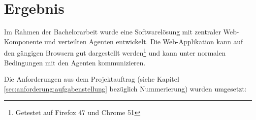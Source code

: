 \begin{comment}
Ergebnisse der Arbeit: was wurde erreicht, was wurde nicht erreicht, Ursachen.
Dieser Abschnitt richtet sich an den speziell für das entsprechende Fachgebiet
interessierten Ingenieur. Er soll es ihm ermöglichen, die für die Problemlösung
gemachten Überlegungen zu verstehen und nachzuvollziehen. Theoretische
Grundlagen sind nur so weit auszuarbeiten, als dies für die Lösung der Aufgabe
nötig ist (keine Lehrbücher schreiben). Die Erkenntnisse aus den theoretischen
Untersuchungen sind wenn immer möglich direkt mit der Problemlösung zu
verknüpfen.

Schlussfolgerungen, Bewertung der Ergebnisse.
Die Schlussfolgerungen bilden zusammen mit der Zusammenfassung die
wichtigsten Abschnitte eines Berichts und sollen daher am sorgfältigsten
ausgearbeitet sein. Die Schlussfolgerungen enthalten eine Zusammenfassung
und Beurteilung der Resultate (Vergleich mit anderen Lösungen, was wurde
erreicht, was nicht, was bleibt noch zu tun, was würde man nun anders tun). In
den Schlussfolgerungen soll auch ein Ausblick auf das weitere Vorgehen bzw.
auf die Bedeutung der erreichten Ergebnisse gegeben werden.

Installationsanleitung vorhanden (inklusive verwendete Entwicklungsumgebung und Werkzeuge), Test-Logs dokumentiert (bei Systemen mit User Interfaces: Dokumentation der Usability Tests)

Ideen für Schlussfolgerung:
* fehlendes Know-How?
* Positives
* negatives
* Vor-/Nachteile Rails? Was wenn ohne Rails gemacht?
\end{comment}

\chapter{Ergebnis}
\label{results}

Im Rahmen der Bachelorarbeit wurde eine Softwarelösung mit zentraler Web-Komponente und verteilten Agenten entwickelt. Die Web-Applikation kann auf den gängigen Browsern gut dargestellt werden\footnote{Getestet auf Firefox 47 und Chrome 51} und kann unter normalen Bedingungen mit den Agenten kommunizieren.

Die Anforderungen aus dem Projektauftrag (siehe Kapitel \ref{sec:anforderung:aufgabenstellung} bezüglich Nummerierung) wurden umgesetzt:

